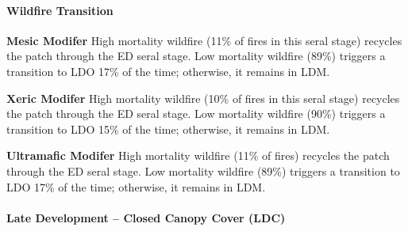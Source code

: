 \paragraph{Wildfire Transition}
\begin{adjustwidth}{2cm}{}
\textbf{Mesic Modifer } High mortality wildfire (11\% of fires in this seral stage) recycles the patch through the ED seral stage. Low mortality wildfire (89\%) triggers a transition to LDO 17\% of the time; otherwise, it remains in LDM.

\medskip
\noindent \textbf{Xeric Modifer} High mortality wildfire (10\% of fires in this seral stage) recycles the patch through the ED seral stage. Low mortality wildfire (90\%) triggers a transition to LDO 15\% of the time; otherwise, it remains in LDM.

\medskip
\noindent \textbf{Ultramafic Modifer}  High mortality wildfire (11\% of fires) recycles the patch through the ED seral stage. Low mortality wildfire (89\%) triggers a transition to LDO 17\% of the time; otherwise, it remains in LDM.

\end{adjustwidth}
\noindent\hrulefill

\paragraph{Late Development – Closed Canopy Cover (LDC)}

